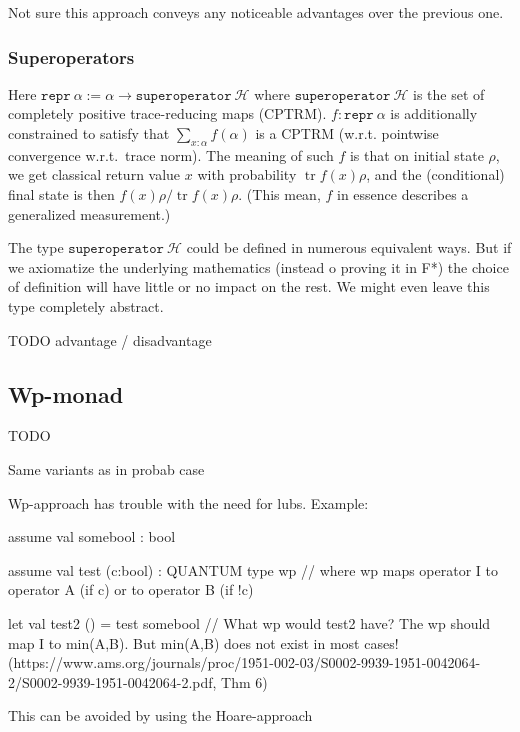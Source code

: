 \documentclass[a4paper]{article}
\newcommand\calH{\mathcal H}
\DeclareMathOperator\tr{tr}
\begin{document}
Not sure this approach conveys any noticeable advantages over the previous one.

\subsubsection{Superoperators}

Here $\mathtt{repr}\ \alpha := \alpha\to\mathtt{superoperator}\ \calH$
where $\mathtt{superoperator}\ \calH$ is the set of completely
positive trace-reducing maps (CPTRM).
$f:\mathtt{repr}\ \alpha$ is additionally constrained to satisfy that $\sum_{x:\alpha} f(\alpha)$ is a CPTRM (w.r.t. pointwise convergence w.r.t.~trace norm).
The meaning of such $f$ is that on initial state $\rho$, we get classical return value $x$ with probability $\tr f(x)\rho$, and the (conditional) final state is then $f(x)\rho/\tr f(x)\rho$.
(This mean, $f$ in essence describes a generalized measurement.)

The type $\mathtt{superoperator}\ \calH$ could be defined in numerous
equivalent ways. But if we axiomatize the underlying mathematics
(instead o proving it in F*) the choice of definition will have little
or no impact on the rest. We might even leave this type completely
abstract.

TODO advantage / disadvantage

\subsection{Wp-monad}

TODO

Same variants as in probab case

Wp-approach has trouble with the need for lubs.
Example:

assume val somebool : bool

assume val test (c:bool) : QUANTUM type wp
// where wp maps operator I to operator A (if c) or to operator B (if !c)

let val test2 () = test somebool
// What wp would test2 have? The wp should map I to min(A,B). But min(A,B) does not exist in most cases!
(https://www.ams.org/journals/proc/1951-002-03/S0002-9939-1951-0042064-2/S0002-9939-1951-0042064-2.pdf, Thm 6)

This can be avoided by using the Hoare-approach





  
\end{document}
